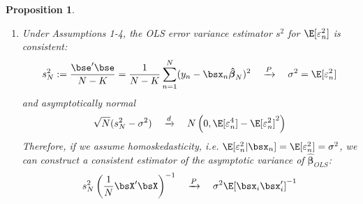 \documentclass[12pt]{article}
\theoremstyle{plain}
\newtheorem{prop}[thm]{Proposition}
\theoremstyle{definition}
\theoremstyle{remark}
\newcommand{\bshatbeta}{\boldsymbol{\hat{\beta}}}
\newcommand{\pto}{\xrightarrow{P}}
\newcommand{\dto}{\xrightarrow{d}}
\newcommand{\sumnN}{\sum^N_{n=1}}
\begin{document}
\begin{prop}
\begin{enumerate}
  \item Under Assumptions 1-4, the OLS error variance estimator $s^2$
    for $\E[\varepsilon_n^2]$ is consistent:
    \begin{align*}
      s^2_N := \frac{\bse' \bse}{N-K}
      =\frac{1}{N-K} \sumnN (y_n-\bsx_n\bshatbeta_N)^2
      \quad\pto\quad \sigma^2 = \E[\varepsilon_n^2]
    \end{align*}
    and asymptotically normal
    \begin{align*}
      \sqrt{N}(s^2_N - \sigma^2)
      \quad\dto\quad
      N\left(0,\E[\varepsilon_n^4]-\E[\varepsilon^2_n]^2\right)
    \end{align*}
    Therefore, if we assume homoskedasticity, i.e.
    $\E[\varepsilon_n^2|\bsx_n]=\E[\varepsilon_n^2]=\sigma^2$, we
    can construct a consistent estimator of the asymptotic variance of
    $\bshatbeta_{OLS}$:
    \begin{align*}
      s_N^2\left(\frac{1}{N} \bsX'\bsX\right)^{-1}
      \quad\pto\quad
      \sigma^2\E[\bsx_i\bsx_i']^{-1}
    \end{align*}
\end{enumerate}
\end{prop}
\end{document}
